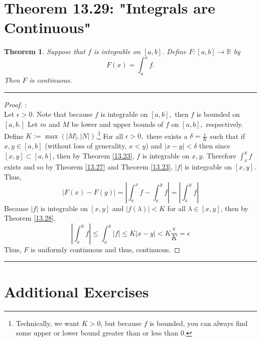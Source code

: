 \documentclass[openany, amssymb, psamsfonts]{amsart}
\newcommand{\bbR}{\mathbb{R}}
\newtheorem{thm}{Theorem}[section]
\theoremstyle{definition}
\numberwithin{equation}{section}
\begin{document}
\section*{Theorem 13.29: "Integrals are Continuous"}
\begin{thm}
\label{13.29}
	Suppose that $f$ is integrable on $[a,b].$  Define $F\colon [a, b] \to \bbR$ by
	\[
		F(x) = \int_{a}^{x} f.
		\]
	Then $F$ 	is continuous.
\end{thm}
\vspace{4pt}     \hrule   \vspace{4pt}  \begin{proof}:\\
Let $\epsilon>0.$ Note that because $f$ is integrable on $[a,b],$ then $f$ is bounded on $[a,b.]$ Let $m$ and $M$ be lower and upper bounds of $f$ on $[a,b],$ respectively. Define $K := \max(|M|, |N|)$.\footnote{Technically, we want $K>0$, but because $f$ is bounded, you can always find some upper or lower bound greater than or less than $0$. } For all $\epsilon>0,$ there exists a $\delta = \frac{\epsilon}{K}$ such that if $x,y \in [a,b]$ (without loss of generality, $x<y$) and $|x-y|< \delta$ then since $[x,y] \subset [a,b]$, then by Theorem \ref{13.23}, $f$ is integrable on $x,y$. Therefore $\int_x^y f$ exists and so by Theorem \ref{13.27} and Theorem \ref{13.23}, $|f|$ is integrable on $[x,y]$. Thus, \[|F(x) - F(y)| = \left|\int_a^xf - \int_a^y f \right |= \left|\int_x ^y f \right|\] Because $|f|$ is integrable on $[x,y]$ and $|f(\lambda)|< K$ for all $\lambda\in [x,y]$, then by Theorem \ref{13.28}, \[\left|\int_x ^y f\right| \leq \int_x^y |f| \leq K|x-y| < K \frac{\epsilon}{K} = \epsilon\] Thus, $F$ is uniformly continuous and thus, continuous.
 
\end{proof}\vspace{4pt}     \hrule   \vspace{4pt} 

\section*{Additional Exercises}
\end{document}

